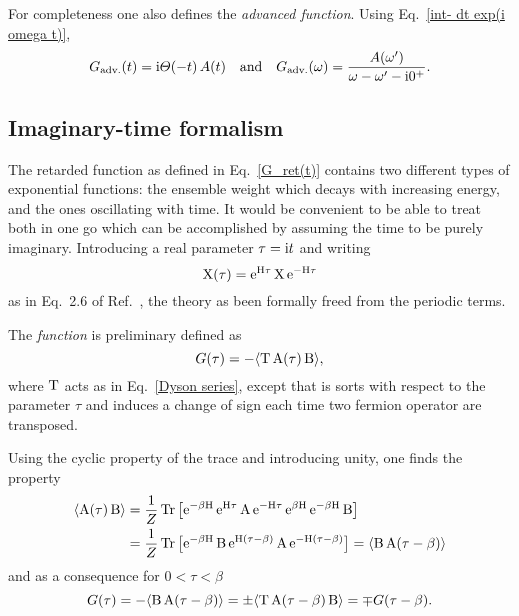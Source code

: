 For completeness one also defines the \emph{advanced  function}.
Using Eq.~\ref{int- dt exp(i omega t)},
%
\begin{equation} \label{G_adv}
    G \sb{\text{adv.}} (t) = \mathrm i \varTheta(-t) \, A(t)
    \quad \text{and} \quad
    G \sb{\text{adv.}} (\omega) = \frac{A(\omega')}{\omega - \omega' - \mathrm i 0^+}.
\end{equation}

\subsection{Imaginary-time formalism}

The retarded  function as defined in Eq.~\ref{G_ret(t)} contains two
different types of exponential functions: the ensemble weight which decays with
increasing energy, and the ones oscillating with time. It would be convenient to
be able to treat both in one go which can be accomplished by assuming the time
to be purely imaginary. Introducing a real parameter $\tau = \mathrm i t$ and writing
%
\begin{equation*}
    \mathrm X(\tau) = \mathrm e^{\mathrm H \tau} \, \mathrm X \, \mathrm e^{-\mathrm H \tau}
\end{equation*}
%
as in Eq.~2.6 of Ref.~, the theory as been formally freed
from the periodic terms.

The \emph{ function} is preliminary defined as
%
\begin{equation*}
    G(\tau) = -\langle\mathrm T \, \mathrm A(\tau) \, \mathrm B\rangle,
\end{equation*}
%
where $\mathrm T$ acts as in Eq.~\ref{Dyson series}, except that is sorts with
respect to the parameter $\tau$ and induces a change of sign each time two
fermion operator are transposed.

Using the cyclic property of the trace and introducing unity, one finds the
property
%
\begin{align*}
    \langle\mathrm A(\tau) \, \mathrm B\rangle &= \frac 1 Z \operatorname{Tr} \big[ \mathrm e^{-\beta \mathrm H} \,
    \mathrm e^{\mathrm H \tau} \, \mathrm A \, \mathrm e^{-\mathrm H \tau} \,
    \mathrm e^{\beta \mathrm H} \, \mathrm e^{-\beta \mathrm H} \, \mathrm B \big]
    \\
    &= \frac 1 Z \operatorname{Tr} \big[ \mathrm e^{-\beta \mathrm H} \, \mathrm B \,
    \mathrm e^{\mathrm H (\tau - \beta)} \, \mathrm A \, \mathrm e^{-\mathrm H (\tau - \beta)} \big]
    = \langle\mathrm B \, \mathrm A(\tau - \beta)\rangle
\end{align*}
%
and as a consequence for $0 < \tau < \beta$
%
\begin{equation} \label{(anti-) periodicity}
    G(\tau)
    = -\langle\mathrm B \, \mathrm A(\tau - \beta)\rangle
    = \pm \langle\mathrm T \, \mathrm A(\tau - \beta) \, \mathrm B\rangle
    = \mp G(\tau - \beta).
\end{equation}

